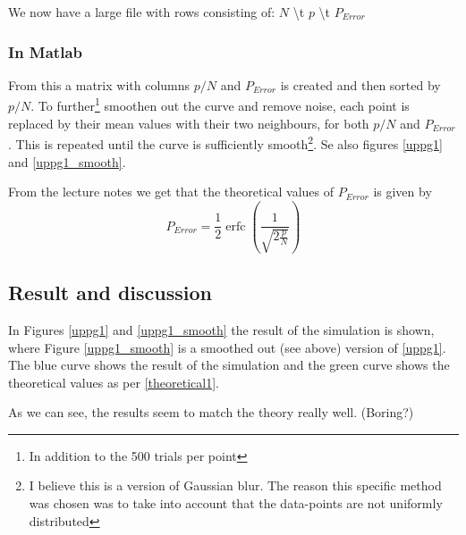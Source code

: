 \documentclass[12pt,a4paper]{article}
\begin{document}
We now have a large file with rows consisting of: $N$ \textbackslash{}t $p$ \textbackslash{}t $P_{Error}$

\subsubsection{In Matlab} \label{inMatlab1}

From this a matrix with columns $p/N$ and $P_{Error}$ is created and then
sorted by $p/N$. To further\footnote{In addition to the 500 trials per point}
smoothen out the curve and remove noise, each point is replaced by their mean
values with their two neighbours, for both $p/N$ and $P_{Error}$. This is
repeated until the curve is sufficiently smooth\footnote{I believe this is a
version of Gaussian blur. The reason this specific method was chosen was to
take into account that the data-points are not uniformly distributed}. Se
also figures \ref{uppg1} and \ref{uppg1_smooth}.


From the lecture notes we get that the theoretical values of $P_{Error}$ is
given by
\begin{equation} \label{theoretical1}
P_{Error} = \frac{1}{2} \operatorname{erfc}(\frac{1}{\sqrt{2 \frac{p}{N}}})
\end{equation}

\subsection{Result and discussion}
In Figures \ref{uppg1} and \ref{uppg1_smooth} the result of the simulation
is shown, where Figure \ref{uppg1_smooth} is a smoothed out (see above)
version of \ref{uppg1}. The blue curve shows the result of the simulation
and the green curve shows the theoretical values as per \eqref{theoretical1}.

As we can see, the results seem to match the theory really well. (Boring?)
\end{document}
